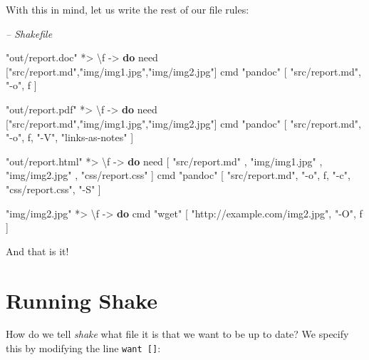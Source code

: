 \documentclass[]{article}
\newenvironment{Shaded}{}{}
\newcommand{\CommentTok}[1]{\textcolor[rgb]{0.38,0.63,0.69}{\textit{#1}}}
\newcommand{\FunctionTok}[1]{\textcolor[rgb]{0.02,0.16,0.49}{#1}}
\newcommand{\KeywordTok}[1]{\textcolor[rgb]{0.00,0.44,0.13}{\textbf{#1}}}
\newcommand{\NormalTok}[1]{#1}
\newcommand{\OtherTok}[1]{\textcolor[rgb]{0.00,0.44,0.13}{#1}}
\newcommand{\StringTok}[1]{\textcolor[rgb]{0.25,0.44,0.63}{#1}}
\begin{document}
With this in mind, let us write the rest of our file rules:

\begin{Shaded}
\begin{Highlighting}[]
\CommentTok{-- Shakefile}

\StringTok{"out/report.doc"} \FunctionTok{*>}\NormalTok{ \textbackslash{}f }\OtherTok{->} \KeywordTok{do}
\NormalTok{    need [}\StringTok{"src/report.md"}\NormalTok{,}\StringTok{"img/img1.jpg"}\NormalTok{,}\StringTok{"img/img2.jpg"}\NormalTok{]}
\NormalTok{    cmd }\StringTok{"pandoc"}\NormalTok{ [ }\StringTok{"src/report.md"}\NormalTok{, }\StringTok{"-o"}\NormalTok{, f ]}

\StringTok{"out/report.pdf"} \FunctionTok{*>}\NormalTok{ \textbackslash{}f }\OtherTok{->} \KeywordTok{do}
\NormalTok{    need [}\StringTok{"src/report.md"}\NormalTok{,}\StringTok{"img/img1.jpg"}\NormalTok{,}\StringTok{"img/img2.jpg"}\NormalTok{]}
\NormalTok{    cmd }\StringTok{"pandoc"}\NormalTok{ [ }\StringTok{"src/report.md"}\NormalTok{, }\StringTok{"-o"}\NormalTok{, f, }\StringTok{"-V"}\NormalTok{, }\StringTok{"links-as-notes"}\NormalTok{ ]}

\StringTok{"out/report.html"} \FunctionTok{*>}\NormalTok{ \textbackslash{}f }\OtherTok{->} \KeywordTok{do}
\NormalTok{    need [ }\StringTok{"src/report.md"}
\NormalTok{         , }\StringTok{"img/img1.jpg"}
\NormalTok{         , }\StringTok{"img/img2.jpg"}
\NormalTok{         , }\StringTok{"css/report.css"}\NormalTok{ ]}
\NormalTok{    cmd }\StringTok{"pandoc"}\NormalTok{ [ }\StringTok{"src/report.md"}\NormalTok{, }\StringTok{"-o"}\NormalTok{, f, }\StringTok{"-c"}\NormalTok{, }\StringTok{"css/report.css"}\NormalTok{, }\StringTok{"-S"}\NormalTok{ ]}

\StringTok{"img/img2.jpg"} \FunctionTok{*>}\NormalTok{ \textbackslash{}f }\OtherTok{->} \KeywordTok{do}
\NormalTok{    cmd }\StringTok{"wget"}\NormalTok{ [ }\StringTok{"http://example.com/img2.jpg"}\NormalTok{, }\StringTok{"-O"}\NormalTok{, f ]}
\end{Highlighting}
\end{Shaded}

And that is it!

\hypertarget{running-shake}{%
\section{Running Shake}\label{running-shake}}

How do we tell \emph{shake} what file it is that we want to be up to date? We
specify this by modifying the line \texttt{want\ {[}{]}}:
\end{document}
